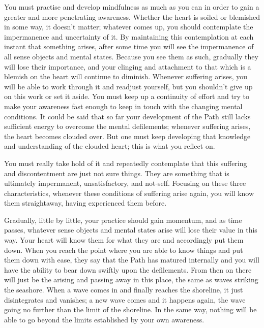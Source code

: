 You must practise and develop mindfulness as much as you can in order to
gain a greater and more penetrating awareness. Whether the heart is
soiled or blemished in some way, it doesn't matter; whatever comes up, 
you should contemplate the impermanence and uncertainty of it. By
maintaining this contemplation at each instant that something arises, 
after some time you will see the impermanence of all sense objects and
mental states. Because you see them as such, gradually they will lose
their importance, and your clinging and attachment to that which is a
blemish on the heart will continue to diminish. Whenever suffering
arises, you will be able to work through it and readjust yourself, but
you shouldn't give up on this work or set it aside. You must keep up a
continuity of effort and try to make your awareness fast enough to keep
in touch with the changing mental conditions. It could be said that so
far your development of the Path still lacks sufficient energy to
overcome the mental defilements; whenever suffering arises, the heart
becomes clouded over. But one must keep developing that knowledge and
understanding of the clouded heart; this is what you reflect on. 

You must really take hold of it and repeatedly contemplate that this
suffering and discontentment are just not sure things. They are
something that is ultimately impermanent, unsatisfactory, and not-self. 
Focusing on these three characteristics, whenever these conditions of
suffering arise again, you will know them straightaway, having
experienced them before. 

Gradually, little by little, your practice should gain momentum, and as
time passes, whatever sense objects and mental states arise will lose
their value in this way. Your heart will know them for what they are and
accordingly put them down. When you reach the point where you are able
to know things and put them down with ease, they say that the Path has
matured internally and you will have the ability to bear down swiftly
upon the defilements. From then on there will just be the arising and
passing away in this place, the same as waves striking the seashore. 
When a wave comes in and finally reaches the shoreline, it just
disintegrates and vanishes; a new wave comes and it happens again, the
wave going no further than the limit of the shoreline. In the same way, 
nothing will be able to go beyond the limits established by your own
awareness. 

